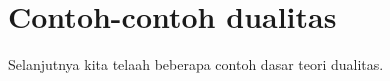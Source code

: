 
\section{Contoh-contoh dualitas}\label{sec:duality-examples}
\hypertarget{o014.aljabr2.chapter9.duality-examples-a}{ }
Selanjutnya kita telaah beberapa contoh dasar teori dualitas.

